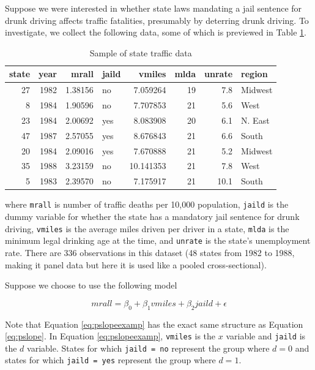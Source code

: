 \documentclass[
]{book}
\begin{document}
Suppose we were interested in whether state laws mandating a jail sentence for drunk driving affects traffic fatalities, presumably by deterring drunk driving. To investigate, we collect the following data, some of which is previewed in Table \ref{tab:trdeath}.

\begin{table}

\caption{\label{tab:trdeath}Sample of state traffic data}
\centering
\begin{tabular}[t]{r|r|r|l|r|r|r|l}
\hline
state & year & mrall & jaild & vmiles & mlda & unrate & region\\
\hline
27 & 1982 & 1.38156 & no & 7.059264 & 19 & 7.8 & Midwest\\
\hline
8 & 1984 & 1.90596 & no & 7.707853 & 21 & 5.6 & West\\
\hline
23 & 1984 & 2.00692 & yes & 8.083908 & 20 & 6.1 & N. East\\
\hline
47 & 1987 & 2.57055 & yes & 8.676843 & 21 & 6.6 & South\\
\hline
20 & 1984 & 2.09016 & yes & 7.670888 & 21 & 5.2 & Midwest\\
\hline
35 & 1988 & 3.23159 & no & 10.141353 & 21 & 7.8 & West\\
\hline
5 & 1983 & 2.39570 & no & 7.175917 & 21 & 10.1 & South\\
\hline
\end{tabular}
\end{table}

where \texttt{mrall} is number of traffic deaths per 10,000 population, \texttt{jaild} is the dummy variable for whether the state has a mandatory jail sentence for drunk driving, \texttt{vmiles} is the average miles driven per driver in a state, \texttt{mlda} is the minimum legal drinking age at the time, and \texttt{unrate} is the state's unemployment rate. There are 336 observations in this dataset (48 states from 1982 to 1988, making it panel data but here it is used like a pooled cross-sectional).

Suppose we choose to use the following model

\begin{equation}
mrall = \beta_0 + \beta_1vmiles + \beta_2jaild + \epsilon
\label{eq:pslopeexamp}
\end{equation}

Note that Equation \eqref{eq:pslopeexamp} has the exact same structure as Equation \eqref{eq:pslope}. In Equation \eqref{eq:pslopeexamp}, \texttt{vmiles} is the \(x\) variable and \texttt{jaild} is the \(d\) variable. States for which \texttt{jaild\ =\ no} represent the group where \(d=0\) and states for which \texttt{jaild\ =\ yes} represent the group where \(d=1\).
\end{document}
